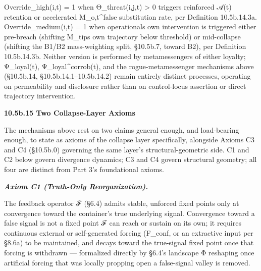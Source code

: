 \documentclass[
]{article}
\begin{document}
Override\_high(i,t) = 1 when Θ\_threat(i,j,t) \textgreater{} 0 triggers
reinforced 𝒜(t) retention or accelerated M\_o,t\^{}false substitution
rate, per Definition 10.5b.14.3a. Override\_medium(i,t) = 1 when
operationals own intervention is triggered either pre-breach (shifting
M\_tips own trajectory below threshold) or mid-collapse (shifting the
B1/B2 mass-weighting split, §10.5b.7, toward B2), per Definition
10.5b.14.3b. Neither version is performed by metamessengers of either
loyalty; Ψ\_loyal(t), Ψ\_loyal\^{}corrob(t), and the rogue-metamessenger
mechanisms above (§10.5b.14, §10.5b.14.1--10.5b.14.2) remain entirely
distinct processes, operating on permeability and disclosure rather than
on control-locus assertion or direct trajectory intervention.

\textbf{10.5b.15 Two Collapse-Layer Axioms}

The mechanisms above rest on two claims general enough, and load-bearing
enough, to state as axioms of the collapse layer specifically, alongside
Axioms C3 and C4 (§10.5b.0) governing the same layer's
structural-geometric side. C1 and C2 below govern divergence dynamics;
C3 and C4 govern structural geometry; all four are distinct from Part
3's foundational axioms.

\emph{\textbf{Axiom C1 (Truth-Only Reorganization).}}

The feedback operator ℱ (§6.4) admits stable, unforced fixed points only
at convergence toward the container's true underlying signal.
Convergence toward a false signal is not a fixed point ℱ can reach or
sustain on its own; it requires continuous external or self-generated
forcing (F\_conf, or an extractive input per §8.6a) to be maintained,
and decays toward the true-signal fixed point once that forcing is
withdrawn --- formalized directly by §6.4's landscape Φ reshaping once
artificial forcing that was locally propping open a false-signal valley
is removed.
\end{document}
